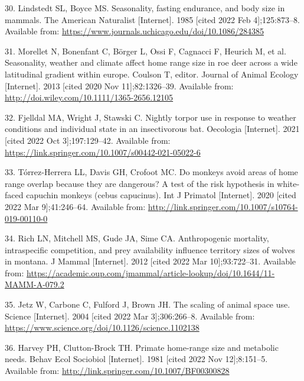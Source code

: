 \documentclass[
  12pt,
]{article}
\newlength{\cslhangindent}
\newenvironment{CSLReferences}[2] %
 {\begin{list}{}{%
  \setlength{\itemindent}{0pt}
  \setlength{\leftmargin}{0pt}
  \setlength{\parsep}{0pt}
  \ifodd #1
   \setlength{\leftmargin}{\cslhangindent}
   \setlength{\itemindent}{-1\cslhangindent}
  \fi
  \setlength{\itemsep}{#2\baselineskip}}}
 {\end{list}}
\begin{document}
\begin{CSLReferences}{0}{1}
30. Lindstedt SL, Boyce MS. Seasonality, fasting endurance, and body size in mammals. The American Naturalist {[}Internet{]}. 1985 {[}cited 2022 Feb 4{]};125:873--8. Available from: \url{https://www.journals.uchicago.edu/doi/10.1086/284385}

31. Morellet N, Bonenfant C, Börger L, Ossi F, Cagnacci F, Heurich M, et al. Seasonality, weather and climate affect home range size in roe deer across a wide latitudinal gradient within europe. Coulson T, editor. Journal of Animal Ecology {[}Internet{]}. 2013 {[}cited 2020 Nov 11{]};82:1326--39. Available from: \url{http://doi.wiley.com/10.1111/1365-2656.12105}

32. Fjelldal MA, Wright J, Stawski C. Nightly torpor use in response to weather conditions and individual state in an insectivorous bat. Oecologia {[}Internet{]}. 2021 {[}cited 2022 Oct 3{]};197:129--42. Available from: \url{https://link.springer.com/10.1007/s00442-021-05022-6}

33. Tórrez-Herrera LL, Davis GH, Crofoot MC. Do monkeys avoid areas of home range overlap because they are dangerous? A test of the risk hypothesis in white-faced capuchin monkeys (cebus capucinus). Int J Primatol {[}Internet{]}. 2020 {[}cited 2022 Mar 9{]};41:246--64. Available from: \url{http://link.springer.com/10.1007/s10764-019-00110-0}

34. Rich LN, Mitchell MS, Gude JA, Sime CA. Anthropogenic mortality, intraspecific competition, and prey availability influence territory sizes of wolves in montana. J Mammal {[}Internet{]}. 2012 {[}cited 2022 Mar 10{]};93:722--31. Available from: \url{https://academic.oup.com/jmammal/article-lookup/doi/10.1644/11-MAMM-A-079.2}

35. Jetz W, Carbone C, Fulford J, Brown JH. The scaling of animal space use. Science {[}Internet{]}. 2004 {[}cited 2022 Mar 3{]};306:266--8. Available from: \url{https://www.science.org/doi/10.1126/science.1102138}

36. Harvey PH, Clutton-Brock TH. Primate home-range size and metabolic needs. Behav Ecol Sociobiol {[}Internet{]}. 1981 {[}cited 2022 Nov 12{]};8:151--5. Available from: \url{http://link.springer.com/10.1007/BF00300828}


\end{CSLReferences}
\end{document}
